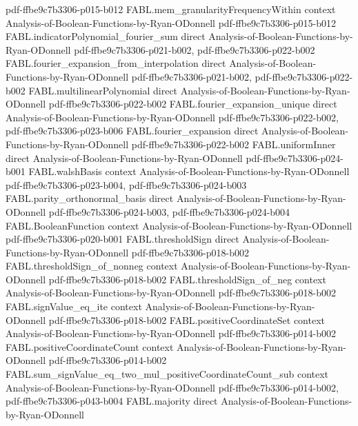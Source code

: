 \begin{theorem}
  {pdf-ffbe9c7b3306-p015-b012}
\proofstep
  {FABL.mem_granularityFrequencyWithin}
  {context}
  {Analysis-of-Boolean-Functions-by-Ryan-ODonnell}
  {pdf-ffbe9c7b3306-p015-b012}
\proofstep
  {FABL.indicatorPolynomial_fourier_sum}
  {direct}
  {Analysis-of-Boolean-Functions-by-Ryan-ODonnell}
  {pdf-ffbe9c7b3306-p021-b002,
    pdf-ffbe9c7b3306-p022-b002}
\proofstep
  {FABL.fourier_expansion_from_interpolation}
  {direct}
  {Analysis-of-Boolean-Functions-by-Ryan-ODonnell}
  {pdf-ffbe9c7b3306-p021-b002,
    pdf-ffbe9c7b3306-p022-b002}
\proofstep
  {FABL.multilinearPolynomial}
  {direct}
  {Analysis-of-Boolean-Functions-by-Ryan-ODonnell}
  {pdf-ffbe9c7b3306-p022-b002}
\proofstep
  {FABL.fourier_expansion_unique}
  {direct}
  {Analysis-of-Boolean-Functions-by-Ryan-ODonnell}
  {pdf-ffbe9c7b3306-p022-b002,
    pdf-ffbe9c7b3306-p023-b006}
\proofstep
  {FABL.fourier_expansion}
  {direct}
  {Analysis-of-Boolean-Functions-by-Ryan-ODonnell}
  {pdf-ffbe9c7b3306-p022-b002}
\proofstep
  {FABL.uniformInner}
  {direct}
  {Analysis-of-Boolean-Functions-by-Ryan-ODonnell}
  {pdf-ffbe9c7b3306-p024-b001}
\proofstep
  {FABL.walshBasis}
  {context}
  {Analysis-of-Boolean-Functions-by-Ryan-ODonnell}
  {pdf-ffbe9c7b3306-p023-b004,
    pdf-ffbe9c7b3306-p024-b003}
\proofstep
  {FABL.parity_orthonormal_basis}
  {direct}
  {Analysis-of-Boolean-Functions-by-Ryan-ODonnell}
  {pdf-ffbe9c7b3306-p024-b003,
    pdf-ffbe9c7b3306-p024-b004}
\proofstep
  {FABL.BooleanFunction}
  {context}
  {Analysis-of-Boolean-Functions-by-Ryan-ODonnell}
  {pdf-ffbe9c7b3306-p020-b001}
\proofstep
  {FABL.thresholdSign}
  {direct}
  {Analysis-of-Boolean-Functions-by-Ryan-ODonnell}
  {pdf-ffbe9c7b3306-p018-b002}
\proofstep
  {FABL.thresholdSign_of_nonneg}
  {context}
  {Analysis-of-Boolean-Functions-by-Ryan-ODonnell}
  {pdf-ffbe9c7b3306-p018-b002}
\proofstep
  {FABL.thresholdSign_of_neg}
  {context}
  {Analysis-of-Boolean-Functions-by-Ryan-ODonnell}
  {pdf-ffbe9c7b3306-p018-b002}
\proofstep
  {FABL.signValue_eq_ite}
  {context}
  {Analysis-of-Boolean-Functions-by-Ryan-ODonnell}
  {pdf-ffbe9c7b3306-p018-b002}
\proofstep
  {FABL.positiveCoordinateSet}
  {context}
  {Analysis-of-Boolean-Functions-by-Ryan-ODonnell}
  {pdf-ffbe9c7b3306-p014-b002}
\proofstep
  {FABL.positiveCoordinateCount}
  {context}
  {Analysis-of-Boolean-Functions-by-Ryan-ODonnell}
  {pdf-ffbe9c7b3306-p014-b002}
\proofstep
  {FABL.sum_signValue_eq_two_mul_positiveCoordinateCount_sub}
  {context}
  {Analysis-of-Boolean-Functions-by-Ryan-ODonnell}
  {pdf-ffbe9c7b3306-p014-b002,
    pdf-ffbe9c7b3306-p043-b004}
\proofstep
  {FABL.majority}
  {direct}
  {Analysis-of-Boolean-Functions-by-Ryan-ODonnell}

\end{theorem}
